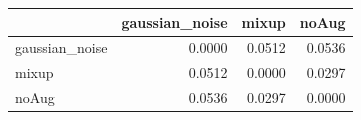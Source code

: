 \begin{tabular}{lrrr}
\toprule
 & gaussian_noise & mixup & noAug \\
\midrule
gaussian_noise & 0.0000 & 0.0512 & 0.0536 \\
mixup & 0.0512 & 0.0000 & 0.0297 \\
noAug & 0.0536 & 0.0297 & 0.0000 \\
\bottomrule
\end{tabular}
